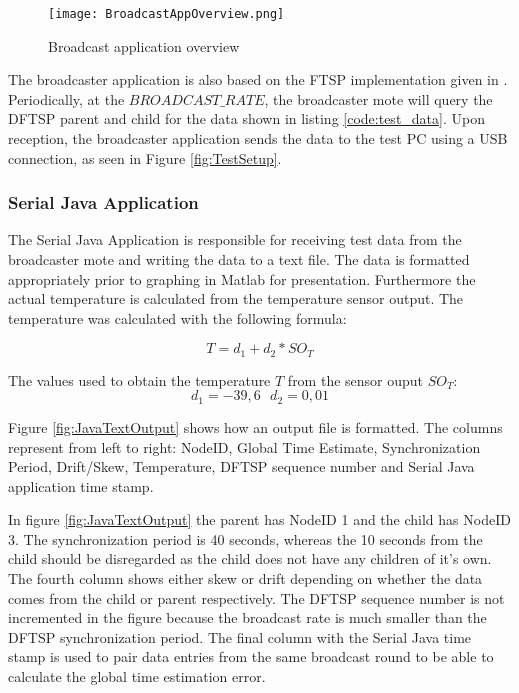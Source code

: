 \documentclass[Main]{subfiles}
\begin{document}
			\begin{figure}[H]
				\centering
				\texttt{[image: BroadcastAppOverview.png]}
				\caption{Broadcast application overview}
				\label{fig:broadCastAppOverview}
			\end{figure}

			The broadcaster application is also based on the FTSP implementation given in \cite{FTSPImplementationTinyOS:Online}.	
			Periodically, at the $BROADCAST\_RATE$, the broadcaster mote will query the DFTSP parent and child for the data shown in listing \ref{code:test_data}.
			Upon reception, the broadcaster application sends the data to the test PC using a USB connection, as seen in Figure \ref{fig:TestSetup}.

	

		
		\subsubsection{Serial Java Application} %
		\label{sub:serial_java_application}
			The Serial Java Application is responsible for receiving test data from the broadcaster mote and writing the data to a text file.
			The data is formatted appropriately prior to graphing in Matlab for presentation.
			Furthermore the actual temperature is calculated from the temperature sensor output.
			The temperature was calculated with the following formula\cite{tempSensorDatasheet}:

			\begin{equation}
			T = d_1 + d_2 * SO_T
			\end{equation} 

			The values used to obtain the temperature $T$ from the sensor ouput $SO_T$:
			\begin{equation}
			d_1 = -39,6\ \ \ d_2 = 0,01
			\end{equation} 

			Figure \ref{fig:JavaTextOutput} shows how an output file is formatted.
			The columns represent from left to right: NodeID, Global Time Estimate, Synchronization Period, Drift/Skew, Temperature, DFTSP sequence number and Serial Java application time stamp.
			
			In figure \ref{fig:JavaTextOutput} the parent has NodeID 1 and the child has NodeID 3.
			The synchronization period is 40 seconds, whereas the 10 seconds from the child should be disregarded as the child does not have any children of it's own.
			The fourth column shows either skew or drift depending on whether the data comes from the child or parent respectively.
			The DFTSP sequence number is not incremented in the figure because the broadcast rate is much smaller than the DFTSP synchronization period.
			The final column with the Serial Java time stamp is used to pair data entries from the same broadcast round to be able to calculate the global time estimation error.
\end{document}
